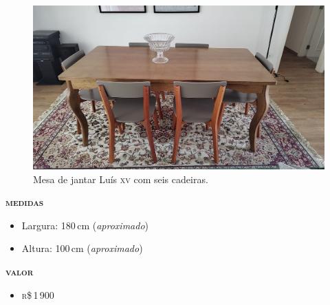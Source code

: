 


\begingroup\thispagestyle{empty}\vspace*{.05\textheight} 

\begin{figure}[htpb!]
\includegraphics[width=\textwidth]{./MEDIA/MESA_JANTAR.jpeg}
\caption{Mesa de jantar Luís \textsc{xv} com seis cadeiras.}
\end{figure}
\noindent\textsc{\textbf{medidas}}
\begin{itemize}
\item Largura: 180\,cm (\textit{aproximado})
\item Altura: 100\,cm (\textit{aproximado})
\end{itemize}
\noindent\textsc{\textbf{valor}}
\begin{itemize}
\item \textsc{r}\$\,1\,900
\end{itemize}

\pagebreak

